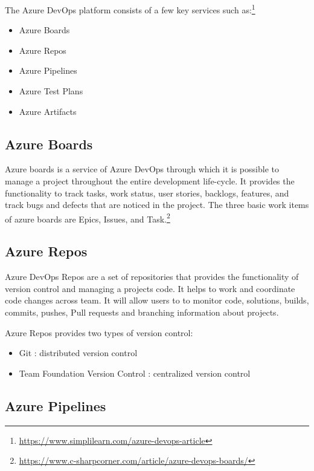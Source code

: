 \documentclass{article}
\begin{document}
The Azure DevOps platform consists of a few key services such as:\footnote{\url{https://www.simplilearn.com/azure-devops-article}}
\begin{itemize}
    \item Azure Boards
    \item Azure Repos
    \item Azure Pipelines
    \item Azure Test Plans
    \item Azure Artifacts
\end{itemize}

\subsection{Azure Boards}

Azure boards is a service of Azure DevOps through which it is possible to manage a project throughout the entire development life-cycle. It provides the functionality to track tasks, work status, user stories, backlogs, features, and track bugs and defects that are noticed in the project. The three basic work items of azure boards are Epics, Issues, and Task.\footnote{\url{https://www.c-sharpcorner.com/article/azure-devops-boards/}}

\subsection{Azure Repos}

Azure DevOps Repos are a set of repositories that provides the functionality of version control and managing a projects code. It helps to work and coordinate code changes across team. It will allow users to to monitor code, solutions, builds, commits, pushes, Pull requests and branching information about projects. 
\par

Azure Repos provides two types of version control:

\begin{itemize}
    \item Git : distributed version control
    \item Team Foundation Version Control : centralized version control
\end{itemize}

\subsection{Azure Pipelines}
\end{document}

